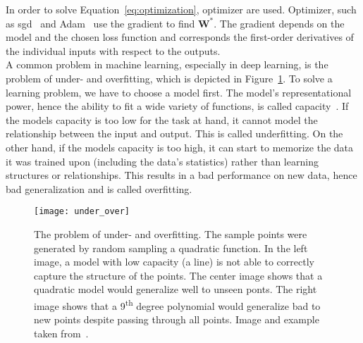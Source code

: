 In order to solve Equation~\ref{eq:optimization}, optimizer are used. Optimizer, such as \gls{sgd}~\cite{Goodfellow2016DeepLearning} and Adam~\cite{Kingma2014Adam:Optimization} use the gradient to find $\textbf{W}^*$. The gradient depends on the model and the chosen loss function and corresponds the first-order derivatives of the individual inputs with respect to the outputs.\\

A common problem in machine learning, especially in deep learning, is the problem of under- and overfitting, which is depicted in Figure~\ref{fig:under_over_fitting}. To solve a learning problem, we have to choose a model first. The model's representational power, hence the ability to fit a wide variety of functions, is called capacity~\cite{Goodfellow2016DeepLearning}. If the models capacity is too low for the task at hand, it cannot model the relationship between the input and output. This is called underfitting. On the other hand, if the models capacity is too high, it can start to memorize the data it was trained upon (including the data's statistics) rather than learning structures or relationships. This results in a bad performance on new data, hence bad generalization and is called overfitting.

\begin{figure}[htbp]
    \centering
	\texttt{[image: under\_over]}
    \caption[Under- and Overfitting]{The problem of under- and overfitting. The sample points were generated by random sampling a quadratic function. In the left image, a model with low capacity (a line) is not able to correctly capture the structure of the points. The center image shows that a quadratic model would generalize well to unseen ponts. The right image shows that a 9\textsuperscript{th} degree polynomial would generalize bad to new points despite passing through all points. Image and example taken from~\cite{Goodfellow2016DeepLearning}.}
    \label{fig:under_over_fitting}
\end{figure}

